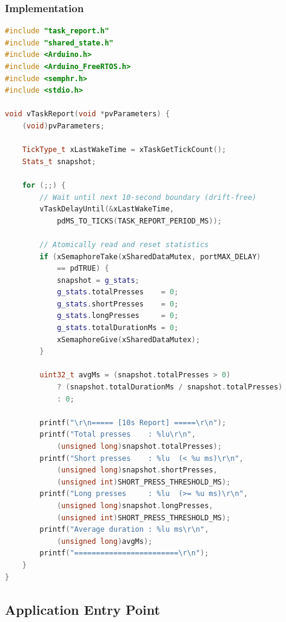 \subsubsection{Implementation}

\begin{lstlisting}[language=C++, caption=lab/lab2\_2/task\_report.cpp --- Task 3: periodic report with drift-free timing, label=lst:task_report_cpp]
#include "task_report.h"
#include "shared_state.h"
#include <Arduino.h>
#include <Arduino_FreeRTOS.h>
#include <semphr.h>
#include <stdio.h>

void vTaskReport(void *pvParameters) {
    (void)pvParameters;

    TickType_t xLastWakeTime = xTaskGetTickCount();
    Stats_t snapshot;

    for (;;) {
        // Wait until next 10-second boundary (drift-free)
        vTaskDelayUntil(&xLastWakeTime,
            pdMS_TO_TICKS(TASK_REPORT_PERIOD_MS));

        // Atomically read and reset statistics
        if (xSemaphoreTake(xSharedDataMutex, portMAX_DELAY)
            == pdTRUE) {
            snapshot = g_stats;
            g_stats.totalPresses    = 0;
            g_stats.shortPresses    = 0;
            g_stats.longPresses     = 0;
            g_stats.totalDurationMs = 0;
            xSemaphoreGive(xSharedDataMutex);
        }

        uint32_t avgMs = (snapshot.totalPresses > 0)
            ? (snapshot.totalDurationMs / snapshot.totalPresses)
            : 0;

        printf("\r\n===== [10s Report] =====\r\n");
        printf("Total presses    : %lu\r\n",
            (unsigned long)snapshot.totalPresses);
        printf("Short presses    : %lu  (< %u ms)\r\n",
            (unsigned long)snapshot.shortPresses,
            (unsigned int)SHORT_PRESS_THRESHOLD_MS);
        printf("Long presses     : %lu  (>= %u ms)\r\n",
            (unsigned long)snapshot.longPresses,
            (unsigned int)SHORT_PRESS_THRESHOLD_MS);
        printf("Average duration : %lu ms\r\n",
            (unsigned long)avgMs);
        printf("========================\r\n");
    }
}
\end{lstlisting}

\subsection{Application Entry Point}

